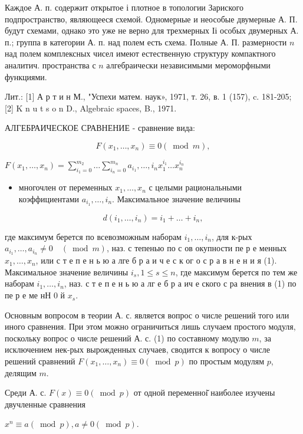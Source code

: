 \documentclass[10pt]{article}
\begin{document}
Каждое А. п. содержит открытое і плотное в топологии Зариского подпространство, являющееся схемой. Одномерные и неособые двумерные А. П. будут схемами, однако это уже не верно для трехмерных Іі особых двумерных А. п.; группа в категории А. п. над полем есть схема. Полные А. П. размерности $n$ над полем комплексных чисел имеют естественную структуру компактного аналитич. пространства с $n$ алгебраически независимыми мероморфными функциями.



Лит.: [1] А р т и н М., "Успехи матем. наук», 1971, т. 26, в. 1 (157), c. 181-205; [2] K n u t s o n D., Algebraic spaces, B., 1971.



АЛГЕБРАИЧЕСКОЕ СРАВНЕНИЕ - сравнение вида:



\[

F\left(x_{1}, \ldots, x_{n}\right) \equiv 0(\bmod m),

\]



$F\left(x_{1}, \ldots, x_{n}\right)=\sum_{i_{1}=0}^{m_{2}} \ldots \sum_{i_{n}=0}^{m_{n}} a_{i_{1}}, \ldots, i_{n} x_{1}^{i_{1}} \ldots x_{n}^{i_{n}}$



\begin{itemize}

  \item многочлен от переменных $x_{1}, \ldots, x_{n}$ с целыми рациональными коэффициентами $a_{i_{1}}, \ldots, i_{n}$. Максимальное значение величины

\end{itemize}



\[

d\left(i_{1}, \ldots, i_{n}\right)=i_{1}+\ldots+i_{n},

\]



где максимум берется по всевозможным наборам $i_{1}, \ldots, i_{n}$, для к-рых $a_{i_{1}}, \ldots, a_{i_{n}} \neq 0 \quad(\bmod m)$, наз. с тепенью по с ов окупности пе р е менных $x_{1}, \ldots, x_{n}$, или с т е п е н ь ю а лге б р а и ч е с к ог о с р а в н е н и я (1). Максимальное значение величины $i_{s}, 1 \leqslant s \leqslant n$, где максимум берется по тем же наборам $i_{1}, \ldots, i_{n}$, наз. с т е п е н ь ю а лг е б р а ич е ского с ра внения в (1) по пе р е ме нН 0 й $x_{s}$.



Основным вопросом в теории А. с. является вопрос о числе решений того или иного сравнения. При этом можно ограничиться лишь случаем простого модуля, поскольку вопрос о числе решений А. с. (1) по составному модулю $m$, за исключением нек-рых вырожденных случаев, сводится к вопросу о числе решений сравнений $F\left(x_{1}, \ldots, x_{n}\right) \equiv 0(\bmod p)$ по простым модулям $p$, делящим $m$.



Среди А. с. $F(x) \equiv 0(\bmod p)$ от одной переменноі̆ наиболее изучены двучленные сравнения



$x^{n} \equiv a(\bmod p), a \neq 0(\bmod p)$.
\end{document}
